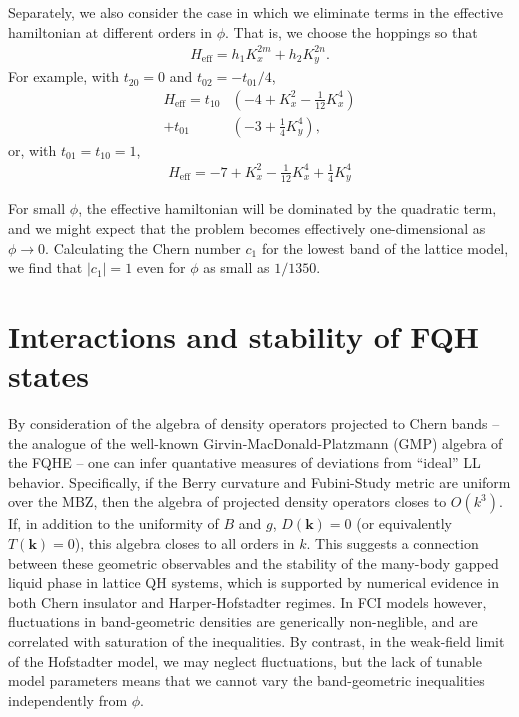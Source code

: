 \documentclass[aps,prb,twocolumn,letterpaper,twoside,nobalancelastpage,groupedaddress,amsmath,amssymb,floatfix,citeautoscript]{revtex4-1}
\begin{document}
Separately, we also consider the case in which we eliminate terms in the effective hamiltonian at different orders in $\phi$. That is, we choose the hoppings so that
\begin{align*}
H_{\text{eff}} = h_1 K_x^{2m} + h_2 K_y^{2n}.
\end{align*}
For example, with $t_{20} = 0$ and $t_{02}=-t_{01}/4$, 
\begin{align*}
H_{\text{eff}} = t_{10}&\left(-4 + K_x^2 - \frac{1}{12}K_x^4\right)\\
+t_{01}&\left(-3+\frac{1}{4}K_y^4\right),
\end{align*}
or, with $t_{01}=t_{10}=1$, 
\begin{align*}
H_{\text{eff}} = -7 + K_x^2 - \frac{1}{12}K_x^4 +\frac{1}{4}K_y^4
\end{align*}

For small $\phi$, the effective hamiltonian will be dominated by the quadratic term, and we might expect that the problem becomes effectively one-dimensional as $\phi \rightarrow 0$. Calculating the Chern number $c_1$ for the lowest band of the lattice model, we find that $|c_1| = 1$ even for $\phi$ as small as $1/1350$.

\section{Interactions and stability of FQH states}
By consideration of the algebra of density operators projected to Chern bands -- the analogue of the well-known Girvin-MacDonald-Platzmann (GMP) algebra of the FQHE \cite{Girvin:1986bu} -- one can infer quantative measures of deviations from ``ideal'' LL behavior\cite{parameswaran_fractional_2012,roy_band_2014}. Specifically, if the Berry curvature and Fubini-Study metric are uniform over the MBZ, then the algebra of projected density operators closes to $O(k^3)$. If, in addition to the uniformity of $B$ and $g$, $D(\mathbf{k})=0$ (or equivalently $T(\mathbf{k})=0$), this algebra closes to all orders in $k$. This suggests a connection between these geometric observables and the stability of the many-body gapped liquid phase in lattice QH systems, which is supported by numerical evidence in both Chern insulator\cite{jackson_geometric_2015} and Harper-Hofstadter\cite{bauer_quantum_2016} regimes. In FCI models however, fluctuations in band-geometric densities are generically non-neglible, and are correlated with saturation of the inequalities. By contrast, in the weak-field limit of the Hofstadter model, we may neglect fluctuations, but the lack of tunable model parameters means that we cannot vary the band-geometric inequalities independently from $\phi$.
\end{document}
